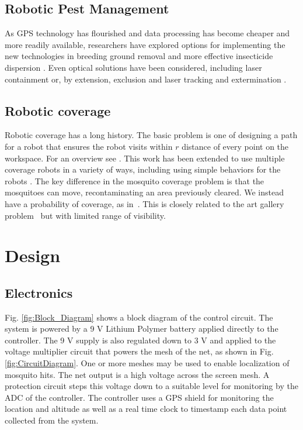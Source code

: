 \documentclass[letterpaper, 10 pt, conference]{ieeeconf}  %
\begin{document}
    \subsection{Robotic Pest Management}
    
As GPS technology has flourished and data processing has become cheaper and more readily available, researchers have explored options for implementing the new technologies in breeding ground removal \cite{anupa2014identification} and more effective insecticide dispersion \cite{hur2015low}.  Even optical solutions have been considered, including laser containment \cite{boonsri2012laser} or, by extension, exclusion and laser tracking and extermination \cite{kare2010build}.
    
    \subsection{Robotic coverage}
    Robotic coverage has a long history. The basic problem is one of designing a path for a robot that ensures the robot visits within $r$ distance of every point on the workspace.  For an overview see \cite{Choset2001}.  This work has been extended to use multiple coverage robots in a variety of ways, including using simple behaviors for the robots \cite{spears2006physics,Koenig2001}.
    The key difference in the mosquito coverage problem is that the mosquitoes can move, recontaminating an area previously cleared. We instead have a probability of coverage, as in~\cite{Das2011}.  This is closely related to the art gallery problem~\cite{lee1986computational} but with limited range of visibility.
    
    
  
  \section{Design}
  
  

  
   \subsection{Electronics}
   
Fig. \ref{fig:Block_Diagram} shows a block diagram of the control circuit.  The system is powered by a 9 V Lithium Polymer battery applied directly to the controller. The 9 V supply is also regulated down to 3 V and applied to the voltage multiplier circuit that powers the mesh of the net, as shown in Fig. \ref{fig:CircuitDiagram}. One or more meshes may be used to enable localization of mosquito hits. The net output is a high voltage across the screen mesh.   A protection circuit steps this voltage down to a suitable level for monitoring by the ADC of the controller. The controller uses a GPS shield for monitoring the location and altitude as well as a real time clock to timestamp each data point collected from the system.     
\end{document}
